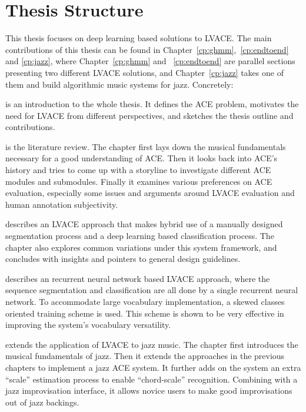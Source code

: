 \section{Thesis Structure} \label{sec:1-outline}
This thesis focuses on deep learning based solutions to LVACE. The main contributions of this thesis can be found in Chapter~\ref{cp:ghmm},~\ref{cp:endtoend} and \ref{cp:jazz}, where Chapter~\ref{cp:ghmm} and ~\ref{cp:endtoend} are parallel sections presenting two different LVACE solutions, and Chapter~\ref{cp:jazz} takes one of them and build algorithmic music systems for jazz. Concretely:

 is an introduction to the whole thesis. It defines the ACE problem, motivates the need for LVACE from different perspectives, and sketches the thesis outline and contributions.

 is the literature review. The chapter first lays down the musical fundamentals necessary for a good understanding of ACE. Then it looks back into ACE's history and tries to come up with a storyline to investigate different ACE modules and submodules. Finally it examines various preferences on ACE evaluation, especially some issues and arguments around LVACE evaluation and human annotation subjectivity.

 describes an LVACE approach that makes hybrid use of a manually designed segmentation process and a deep learning based classification process. The chapter also explores common variations under this system framework, and concludes with insights and pointers to general design guidelines.

 describes an recurrent neural network based LVACE approach, where the sequence segmentation and classification are all done by a single recurrent neural network. To accommodate large vocabulary implementation, a skewed classes oriented training scheme is used. This scheme is shown to be very effective in improving the system's vocabulary versatility.

 extends the application of LVACE to jazz music. The chapter first introduces the musical fundamentals of jazz. Then it extends the approaches in the previous chapters to implement a jazz ACE system. It further adds on the system an extra ``scale'' estimation process to enable ``chord-scale'' recognition. Combining with a jazz improvisation interface, it allows novice users to make good improvisations out of jazz backings.

